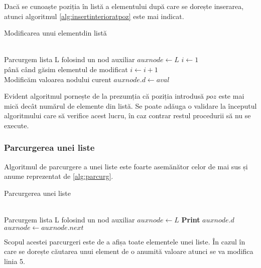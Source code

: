 Dacă se cunoaște poziția în listă a elementului după care se dorește inserarea, atunci algoritmul \ref{alg:insertinterioratpoz} este mai indicat.

\begin{algorithm}[H]
	\caption{Modificarea unui elementdin listă}\label{alg:insertinterioratpoz}
	\begin{algorithmic}[1]
		 \\				
		\Comment Parcurgem lista L folosind un nod auxiliar  \hfill \tab{}\tab{}
		\State $auxnode \gets L$
		\State $i \gets 1$\\
		\Comment până când găsim elementul de modificat  \hfill \tab{} \tab{}
		\While {$poz \neq  i$}
		\State $i \gets i+1$
		\EndWhile 	\\
		\Comment Modificăm valoarea nodului curent \hfill \tab{} \tab{} \tab{} 
		\State $auxnode.d \gets aval$
\EndProcedure
	\end{algorithmic}
\end{algorithm}

Evident algoritmul pornește de la prezumția că poziția introdusă $poz$ este mai mică decât numărul de elemente din listă. Se poate adăuga o validare la începutul algoritmului care să verifice acest lucru, în caz contrar restul procedurii să nu se execute.

\subsubsection{Parcurgerea unei liste}

Algoritmul de parcurgere a unei liste este foarte asemănător celor de mai sus și anume reprezentat de \ref{alg:parcurg}.

\begin{algorithm}[H]
	\caption{Parcurgerea unei liste}\label{alg:parcurg}
	\begin{algorithmic}[1]
		 \\				
		\Comment Parcurgem lista L folosind un nod auxiliar  \hfill \tab{}\tab{}
		\State $auxnode \gets L$		
		\While {$auxnode \neq  NULL$}
		\State \textbf{Print }  $auxnode.d$
		\State $auxnode \gets auxnode.next$
		\EndWhile 	
		\EndProcedure
	\end{algorithmic}
\end{algorithm}

Scopul acestei parcurgeri este de a afișa toate elementele unei liste. În cazul în care se dorește căutarea unui element de o anumită valoare atunci se va modifica linia 5.

